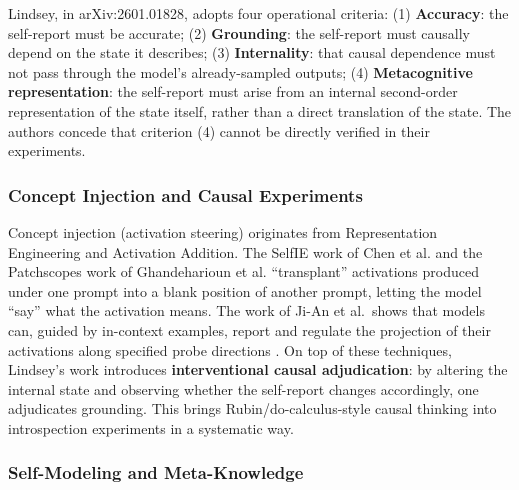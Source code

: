 Lindsey, in arXiv:2601.01828, adopts four operational criteria\cite{lindsey-2026-introspection}:
(1) \textbf{Accuracy}: the self-report must be accurate; (2) \textbf{Grounding}: the
self-report must causally depend on the state it describes; (3) \textbf{Internality}: that
causal dependence must not pass through the model's already-sampled outputs;
(4) \textbf{Metacognitive representation}: the self-report must arise from an internal
second-order representation of the state itself, rather than a direct translation of the
state. The authors concede that criterion (4) cannot be directly verified in their
experiments.

\subsubsection{Concept Injection and Causal Experiments}

Concept injection (activation steering) originates from Representation
Engineering\cite{zou-2023-repeng} and Activation Addition\cite{turner-2023-actadd}. The SelfIE
work of Chen et al.\cite{chen-2024-selfie} and the Patchscopes work of Ghandeharioun et
al.\cite{ghandeharioun-2024-patchscopes} ``transplant'' activations produced under one prompt
into a blank position of another prompt, letting the model ``say'' what the activation means.
The work of Ji-An et al.\ shows that models can, guided by in-context examples, report and
regulate the projection of their activations along specified probe directions
\cite{ji-an-2025-metacog}. On top of these techniques, Lindsey's work introduces
\textbf{interventional causal adjudication}: by altering the internal state and observing
whether the self-report changes accordingly, one adjudicates grounding. This brings
Rubin/do-calculus-style causal thinking\cite{pearl-2009} into introspection experiments
in a systematic way.

\subsubsection{Self-Modeling and Meta-Knowledge}

